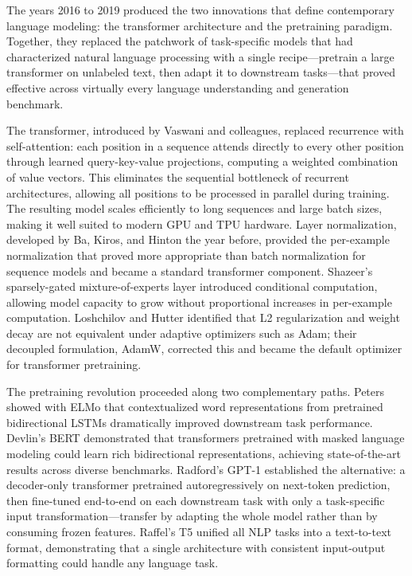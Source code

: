 
The years 2016 to 2019 produced the two innovations that define contemporary language modeling: the transformer architecture and the pretraining paradigm. Together, they replaced the patchwork of task-specific models that had characterized natural language processing with a single recipe---pretrain a large transformer on unlabeled text, then adapt it to downstream tasks---that proved effective across virtually every language understanding and generation benchmark.

The transformer, introduced by Vaswani and colleagues, replaced recurrence with self-attention: each position in a sequence attends directly to every other position through learned query-key-value projections, computing a weighted combination of value vectors. This eliminates the sequential bottleneck of recurrent architectures, allowing all positions to be processed in parallel during training. The resulting model scales efficiently to long sequences and large batch sizes, making it well suited to modern GPU and TPU hardware. Layer normalization, developed by Ba, Kiros, and Hinton the year before, provided the per-example normalization that proved more appropriate than batch normalization for sequence models and became a standard transformer component. Shazeer's sparsely-gated mixture-of-experts layer introduced conditional computation, allowing model capacity to grow without proportional increases in per-example computation. Loshchilov and Hutter identified that L2 regularization and weight decay are not equivalent under adaptive optimizers such as Adam; their decoupled formulation, AdamW, corrected this and became the default optimizer for transformer pretraining.

The pretraining revolution proceeded along two complementary paths. Peters showed with ELMo that contextualized word representations from pretrained bidirectional LSTMs dramatically improved downstream task performance. Devlin's BERT demonstrated that transformers pretrained with masked language modeling could learn rich bidirectional representations, achieving state-of-the-art results across diverse benchmarks. Radford's GPT-1 established the alternative: a decoder-only transformer pretrained autoregressively on next-token prediction, then fine-tuned end-to-end on each downstream task with only a task-specific input transformation---transfer by adapting the whole model rather than by consuming frozen features. Raffel's T5 unified all NLP tasks into a text-to-text format, demonstrating that a single architecture with consistent input-output formatting could handle any language task.

